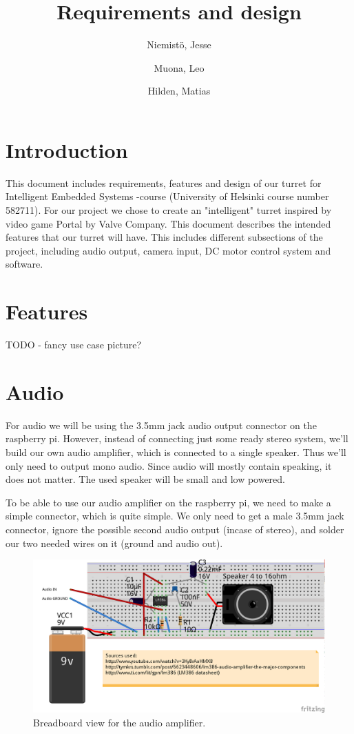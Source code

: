 \documentclass[english,11pt,twoside,a4paper]{article}
\begin{document}
\author{
  Niemistö, Jesse
  \and
  Muona, Leo
  \and
  Hilden, Matias
}
\title{Requirements and design}

\maketitle

\section{Introduction}
This document includes requirements, features and design of our turret for Intelligent Embedded Systems -course (University of Helsinki course number 582711). For our project we chose to create an "intelligent" turret inspired by video game Portal by Valve Company. This document describes the intended features that our turret will have. This includes different subsections of the project, including audio output, camera input, DC motor control system and software.

\section{Features}
TODO
- fancy use case picture?

\section{Audio}

For audio we will be using the 3.5mm jack audio output connector on the raspberry pi. However, instead of connecting just some ready stereo system, we'll build our own audio amplifier, which is connected to a single speaker. Thus we'll only need to output mono audio. Since audio will mostly contain speaking, it does not matter. The used speaker will be small and low powered.

To be able to use our audio amplifier on the raspberry pi, we need to make a simple connector, which is quite simple. We only need to get a male 3.5mm jack connector, ignore the possible second audio output (incase of stereo), and solder our two needed wires on it (ground and audio out).

\begin{figure}
  \begin{center}
    \includegraphics[scale=0.75]{audio_amplifier_lm386_bb.png}
    \caption{Breadboard view for the audio amplifier.}
  \end{center}
  \label{lm386_bb}
\end{figure}
\end{document}
